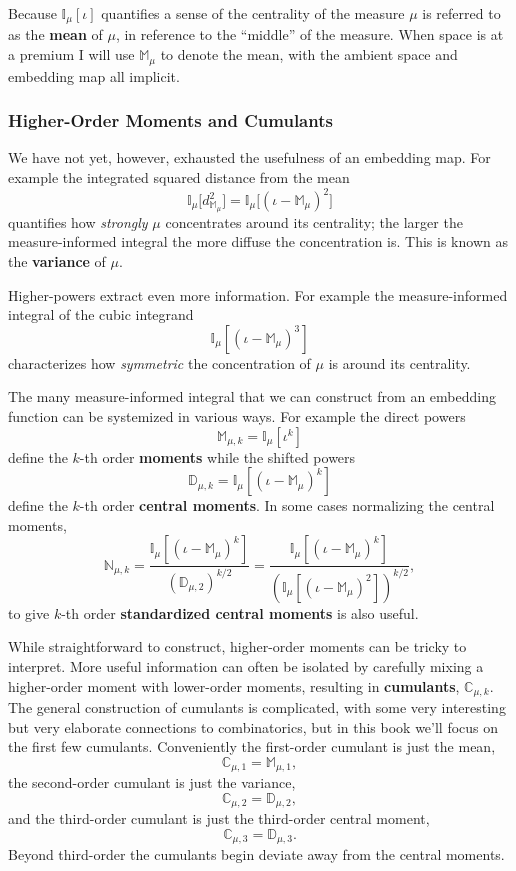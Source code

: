 \documentclass[
  letterpaper,
  DIV=11,
  numbers=noendperiod]{scrartcl}
\begin{document}
Because \(\mathbb{I}_{\mu} \left[ \iota \right]\) quantifies a sense of
the centrality of the measure \(\mu\) is referred to as the
\textbf{mean} of \(\mu\), in reference to the ``middle'' of the measure.
When space is at a premium I will use \(\mathbb{M}_{\mu}\) to denote the
mean, with the ambient space and embedding map all implicit.

\hypertarget{higher-order-moments-and-cumulants}{%
\subsubsection{Higher-Order Moments and
Cumulants}\label{higher-order-moments-and-cumulants}}

We have not yet, however, exhausted the usefulness of an embedding map.
For example the integrated squared distance from the mean \[
\mathbb{I}_{\mu} \bigg[ d_{\mathbb{M}_{\mu}}^{2} \bigg]
=
\mathbb{I}_{\mu} \bigg[ (\iota - \mathbb{M}_{\mu})^{2} \bigg]
\] quantifies how \emph{strongly} \(\mu\) concentrates around its
centrality; the larger the measure-informed integral the more diffuse
the concentration is. This is known as the \textbf{variance} of \(\mu\).

Higher-powers extract even more information. For example the
measure-informed integral of the cubic integrand \[
\mathbb{I}_{\mu} \left[ (\iota - \mathbb{M}_{\mu})^{3} \right]
\] characterizes how \emph{symmetric} the concentration of \(\mu\) is
around its centrality.

The many measure-informed integral that we can construct from an
embedding function can be systemized in various ways. For example the
direct powers \[
\mathbb{M}_{\mu, k} = \mathbb{I}_{\mu} \left[ \iota^{k} \right]
\] define the \(k\)-th order \textbf{moments} while the shifted powers
\[
\mathbb{D}_{\mu, k} =
\mathbb{I}_{\mu} \left[ (\iota - \mathbb{M}_{\mu})^{k} \right]
\] define the \(k\)-th order \textbf{central moments}. In some cases
normalizing the central moments, \[
\mathbb{N}_{\mu, k} =
\frac{ \mathbb{I}_{\mu} \left[ (\iota - \mathbb{M}_{\mu})^{k} \right] }
{ (\mathbb{D}_{\mu, 2})^{k / 2} }
=
\frac{ \mathbb{I}_{\mu} \left[ (\iota - \mathbb{M}_{\mu})^{k} \right] }
{ \left(
    \mathbb{I}_{\mu} \left[ (\iota - \mathbb{M}_{\mu})^{2} \right]
  \right)^{k / 2} },
\] to give \(k\)-th order \textbf{standardized central moments} is also
useful.

While straightforward to construct, higher-order moments can be tricky
to interpret. More useful information can often be isolated by carefully
mixing a higher-order moment with lower-order moments, resulting in
\textbf{cumulants}, \(\mathbb{C}_{\mu, k}\). The general construction of
cumulants is complicated, with some very interesting but very elaborate
connections to combinatorics, but in this book we'll focus on the first
few cumulants. Conveniently the first-order cumulant is just the mean,
\[
\mathbb{C}_{\mu, 1} = \mathbb{M}_{\mu, 1},
\] the second-order cumulant is just the variance, \[
\mathbb{C}_{\mu, 2} = \mathbb{D}_{\mu, 2},
\] and the third-order cumulant is just the third-order central moment,
\[
\mathbb{C}_{\mu, 3} = \mathbb{D}_{\mu, 3}.
\] Beyond third-order the cumulants begin deviate away from the central
moments.
\end{document}
